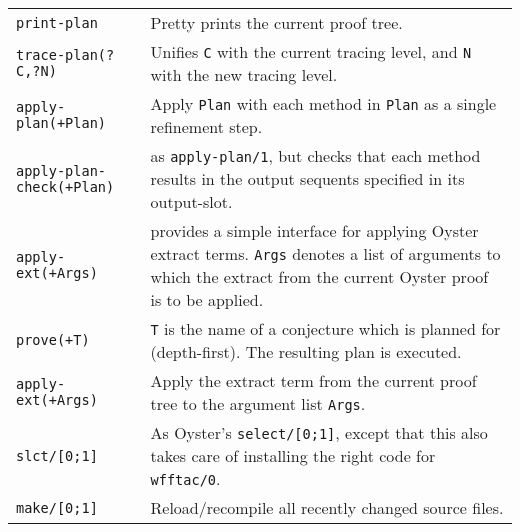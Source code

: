 {\begin{supertabular}{@{}lp{.5\textwidth}@{}}
{\tt print-plan} & Pretty prints the current proof tree.\\
{\tt trace-plan(?C,?N)} & Unifies {\tt C} with the  current tracing
		level, and {\tt N} with the new tracing level. \\
{\tt apply-plan(+Plan)} & Apply {\tt Plan} with each method in {\tt Plan} as
		a single refinement step.\\
{\tt apply-plan-check(+Plan)} & as {\tt apply-plan/1}, but checks that
		each method results in the output sequents specified
		in its output-slot. \\
{\tt apply-ext(+Args)}  &  provides a simple interface for applying Oyster
                           extract terms. {\tt Args} denotes a list of
                           arguments to which the extract from the current
                           Oyster proof is to be applied. \\
{\tt prove(+T)}  & {\tt T} is the name of a conjecture which is
                   planned for (depth-first). The resulting plan 
                   is executed. \\
{\tt apply-ext(+Args)} & Apply the extract term from the current proof tree
                         to the argument list {\tt Args}. \\ \hline
{\tt slct/[0;1]} & As Oyster's {\tt select/[0;1]}, except that this
		also takes care of installing the right code for {\tt
		wfftac/0}.\\	\hline
{\tt make/[0;1]} & Reload/recompile all recently changed source files.
\end{supertabular}}
\fi


